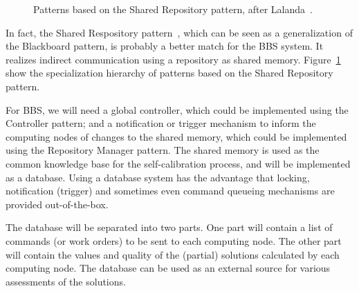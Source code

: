 \documentclass[10pt]{lofar}
\begin{document}
\begin{figure}[!ht]
\centering
{}
\caption{Patterns based on the Shared Repository pattern, after Lalanda~\cite{Lalanda1998}.}
\label{fig:shared-repository-pattern}
\end{figure}

In fact, the Shared Respository pattern~\cite{Lalanda1998}, which can be seen
as a generalization of the Blackboard pattern, is probably a better match for
the BBS system. It realizes indirect communication using a repository as
shared memory. Figure~\ref{fig:shared-repository-pattern} show the
specialization hierarchy of patterns based on the Shared Repository pattern.

For BBS, we will need a global controller, which could be implemented using
the Controller pattern; and a notification or trigger mechanism to inform the
computing nodes of changes to the shared memory, which could be implemented
using the Repository Manager pattern. The shared memory is used as the common
knowledge base for the self-calibration process, and will be implemented as a
database. Using a database system has the advantage that locking, notification
(trigger) and sometimes even command queueing mechanisms are provided
out-of-the-box.

The database will be separated into two parts. One part will contain a list of
commands (or work orders) to be sent to each computing node. The other part
will contain the values and quality of the (partial) solutions calculated by
each computing node. The database can be used as an external source for
various assessments of the solutions.

%
%
%
%
\end{document}
